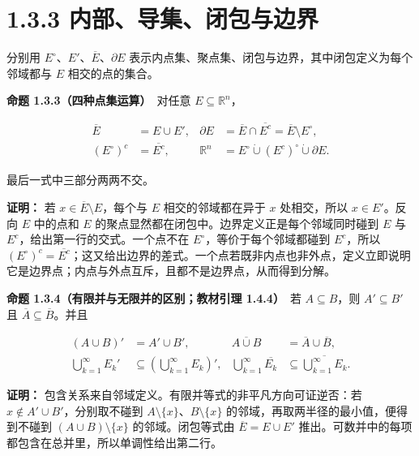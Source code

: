 \documentclass[11pt,a4paper]{article}
\begin{document}
\section[\S{}1.3.3
内部、导集、闭包与边界]{1.3.3
内部、导集、闭包与边界}\label{ux5185ux90e8ux5bfcux96c6ux95edux5305ux4e0eux8fb9ux754c}

分别用 \(E^\circ\)、\(E'\)、\(\overline E\)、\(\partial E\)
表示内点集、聚点集、闭包与边界，其中闭包定义为每个邻域都与 \(E\)
相交的点的集合。

\textbf{命题 1.3.3（四种点集运算）}　对任意 \(E\subseteq\mathbb R^n\)，

\begin{equation*}
\begin{aligned}
\overline E&=E\cup E',&
\partial E&=\overline E\cap\overline{E^c}=\overline E\setminus E^\circ,\\
(E^\circ)^c&=\overline{E^c},&
\mathbb R^n&=E^\circ\mathbin{\dot\cup}(E^c)^\circ\mathbin{\dot\cup}\partial E.
\end{aligned}\tag{1.3.3}
\end{equation*}

最后一式中三部分两两不交。

\textbf{证明：} 若 \(x\in\overline E\setminus E\)，每个与 \(E\)
相交的邻域都在异于 \(x\) 处相交，所以 \(x\in E'\)。反向 \(E\) 中的点和
\(E\) 的聚点显然都在闭包中。边界定义正是每个邻域同时碰到 \(E\) 与
\(E^c\)，给出第一行的交式。一个点不在 \(E^\circ\)，等价于每个邻域都碰到
\(E^c\)，所以
\((E^\circ)^c=\overline{E^c}\)；这又给出边界的差式。一个点若既非内点也非外点，定义立即说明它是边界点；内点与外点互斥，且都不是边界点，从而得到分解。

\textbf{命题 1.3.4（有限并与无限并的区别；教材引理 1.4.4）}　若
\(A\subseteq B\)，则 \(A'\subseteq B'\) 且
\(\overline A\subseteq\overline B\)。并且

\begin{equation*}
\begin{aligned}
(A\cup B)'&=A'\cup B',&
\overline{A\cup B}&=\overline A\cup\overline B,\\
\bigcup_{k=1}^\infty E_k'&\subseteq\left(\bigcup_{k=1}^\infty E_k\right)',&
\bigcup_{k=1}^\infty\overline{E_k}&\subseteq\overline{\bigcup_{k=1}^\infty E_k}.
\end{aligned}\tag{1.3.4}
\end{equation*}

\textbf{证明：} 包含关系来自邻域定义。有限并等式的非平凡方向可证逆否：若
\(x\notin A'\cup B'\)，分别取不碰到
\(A\setminus\{x\}\)、\(B\setminus\{x\}\)
的邻域，再取两半径的最小值，便得到不碰到 \((A\cup B)\setminus\{x\}\)
的邻域。闭包等式由 \(\overline E=E\cup E'\)
推出。可数并中的每项都包含在总并里，所以单调性给出第二行。
\end{document}
